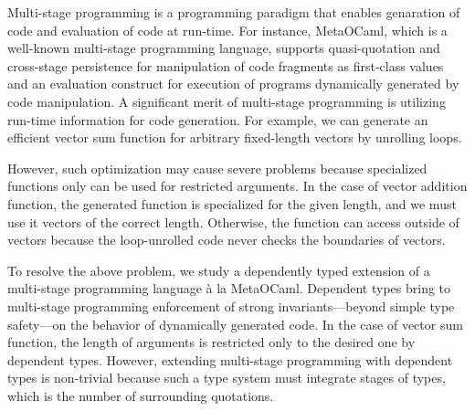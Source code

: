 \documentclass[master,english]{kuisthesis}
\begin{document}
\date{Feburary 15, 2020}			%

\maketitle

\begin{eabstract}


Multi-stage programming is a programming paradigm that enables genaration of
code and evaluation of code at run-time. For instance, MetaOCaml, which is
a well-known multi-stage programming language, supports quasi-quotation and
cross-stage persistence for manipulation of code fragments as first-class
values and an evaluation construct for execution of programs dynamically
generated by code manipulation. A significant merit of multi-stage
programming is utilizing run-time information for code generation. For
example, we can generate an efficient vector sum function for arbitrary
fixed-length vectors by unrolling loops.


However, such optimization may cause severe problems because specialized
functions only can be used for restricted arguments. In the case of vector
addition function, the generated function is specialized for the given
length, and we must use it vectors of the correct length. Otherwise, the
function can access outside of vectors because the loop-unrolled code never
checks the boundaries of vectors.


To resolve the above problem, we study a dependently typed extension of a
multi-stage programming language \`a la MetaOCaml. Dependent types bring to
multi-stage programming enforcement of strong invariants---beyond simple
type safety---on the behavior of dynamically generated code. In the case of
vector sum function, the length of arguments is restricted only to the
desired one by dependent types. However, extending multi-stage programming
with dependent types is non-trivial because such a type system must
integrate stages of types, which is the number of surrounding quotations.


\end{eabstract}
\end{document}
